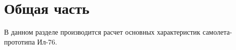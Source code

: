 \chapter{Общая часть}
В данном разделе производится расчет основных характеристик самолета-прототипа 
Ил-76. 





